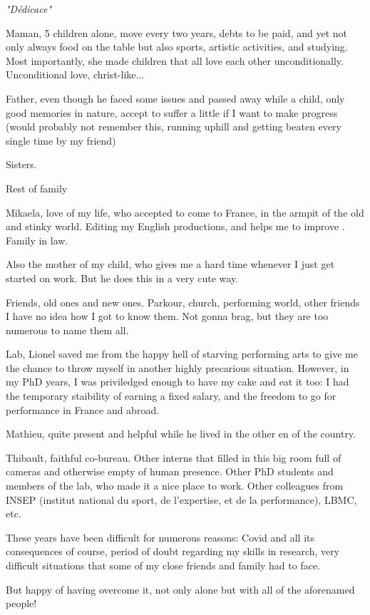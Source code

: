 
\vspace*{20cm}

\begin{flushright}
\emph{"Dédicace"} \\
\end{flushright}

Maman, 5 children alone, move every two years, debts to be paid, and yet not only always food on the table but also sports, artistic activities, and studying. Most importantly, she made children that all love each other unconditionally. Unconditional love, christ-like... 

Father, even though he faced some issues and passed away while a child, only good memories in nature, accept to suffer a little if I want to make progress (would probably not remember this, running uphill and getting beaten every single time by my friend)

Sisters.

Rest of family

Mikaela, love of my life, who accepted to come to France, in the armpit of the old and stinky world. 
Editing my English productions, and helps me to improve .
Family in law.

Also the mother of my child, who gives me a hard time whenever I just get started on work. But he does this in a very cute way.

Friends, old ones and new ones. Parkour, church, performing world, other friends I have no idea how I got to know them. Not gonna brag, but they are too numerous to name them all. 

Lab, Lionel saved me from the happy hell of starving performing arts to give me the chance to throw myself in another highly precarious situation. However, in my PhD years, I was priviledged enough to have my cake and eat it too: I had the temporary staibility of earning a fixed salary, and the freedom to go for performance in France and abroad.

Mathieu, quite present and helpful while he lived in the other en of the country.

Thibault, faithful co-bureau. Other interns that filled in this big room full of cameras and otherwise empty of human presence. Other PhD students and members of the lab, who made it a nice place to work. Other colleagues from INSEP (institut national du sport, de l'expertise, et de la performance), LBMC, etc.

These years have been difficult for numerous reasons: Covid and all its consequences of course, period of doubt regarding my skills in research, very difficult situations that some of my close friends and family had to face.

But happy of having overcome it, not only alone but with all of the aforenamed people!